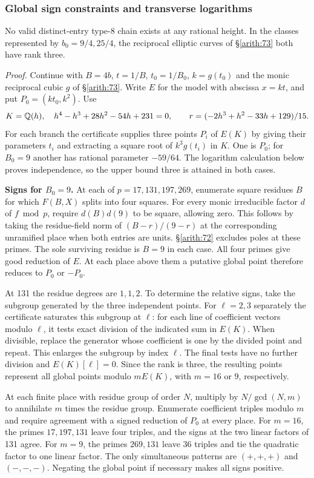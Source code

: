 \subsubsection{Global sign constraints and transverse logarithms}\label{arith:74}

No valid distinct-entry type-8 chain exists at any
rational height. In the classes represented by \(b_0=9/4,25/4\), the
reciprocal elliptic curves of \S\ref{arith:73} both have rank three.

\emph{Proof.} Continue with \(B=4b\), \(t=1/B\), \(t_0=1/B_0\),
\(k=g(t_0)\) and the monic reciprocal cubic \(g\) of \S\ref{arith:73}.
Write \(E\) for the model with abscissa \(x=kt\), and put
\(P_0=(kt_0,k^2)\). Use
\[K=\mathbb Q(h),\quad h^4-h^3+28h^2-54h+231=0,
 \qquad r=(-2h^3+h^2-33h+129)/15 .\]
For each branch the certificate supplies three points \(P_i\) of
\(E(K)\) by giving their parameters \(t_i\) and extracting a square
root of \(k^3g(t_i)\) in \(K\). One is \(P_0\); for \(B_0=9\) another
has rational parameter \(-59/64\). The logarithm calculation below
proves independence, so the upper bound three is attained in both cases.

\textbf{Signs for \(B_0=9\).} At each of \(p=17,131,197,269\), enumerate
square residues \(B\) for which \(F(B,X)\) splits into four squares.
For every monic irreducible factor \(d\) of \(f\bmod p\), require
\(d(B)d(9)\) to be square, allowing zero. This follows by taking
the residue-field norm of \((B-r)/(9-r)\) at the corresponding
unramified place when both entries are units. \S\ref{arith:72} excludes
poles at these primes. The sole surviving residue is \(B=9\) in each
case. All four primes give good reduction of \(E\). At each place
above them a putative global point therefore reduces to \(P_0\) or
\(-P_0\).

At 131 the residue degrees are \(1,1,2\). To determine the relative
signs, take the subgroup generated by the three independent points.
For \(\ell=2,3\) separately the certificate saturates this subgroup at
\(\ell\): for each line of coefficient vectors modulo \(\ell\), it
tests exact division of the indicated sum in \(E(K)\). When divisible,
replace the generator whose coefficient is one by the divided point
and repeat. This enlarges the subgroup by index \(\ell\). The final
tests have no further division and \(E(K)[\ell]=0\). Since the rank
is three, the resulting points represent all global points modulo
\(mE(K)\), with \(m=16\) or \(9\), respectively.

At each finite place with residue group of order \(N\), multiply by
\(N/\gcd(N,m)\) to annihilate \(m\) times the residue group. Enumerate
coefficient triples modulo \(m\) and require agreement with a signed
reduction of \(P_0\) at every place. For \(m=16\), the primes
\(17,197,131\) leave four triples, and the signs at the two linear
factors of 131 agree. For \(m=9\), the primes \(269,131\) leave
36 triples and tie the quadratic factor to one linear factor.
The only simultaneous patterns are \((+,+,+)\) and \((-,-,-)\).
Negating the global point if necessary makes all signs positive.

